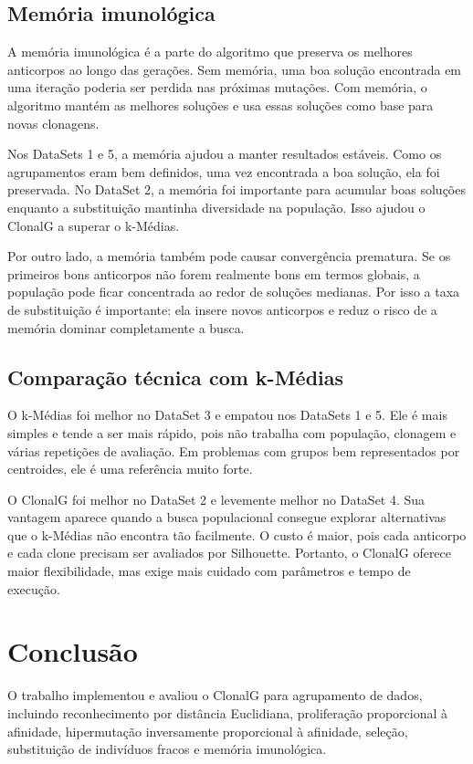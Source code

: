 \documentclass[12pt,a4paper]{article}
\begin{document}
\subsection{Memória imunológica}

A memória imunológica é a parte do algoritmo que preserva os melhores anticorpos ao longo das gerações. Sem memória, uma boa solução encontrada em uma iteração poderia ser perdida nas próximas mutações. Com memória, o algoritmo mantém as melhores soluções e usa essas soluções como base para novas clonagens.

Nos DataSets 1 e 5, a memória ajudou a manter resultados estáveis. Como os agrupamentos eram bem definidos, uma vez encontrada a boa solução, ela foi preservada. No DataSet 2, a memória foi importante para acumular boas soluções enquanto a substituição mantinha diversidade na população. Isso ajudou o ClonalG a superar o k-Médias.

Por outro lado, a memória também pode causar convergência prematura. Se os primeiros bons anticorpos não forem realmente bons em termos globais, a população pode ficar concentrada ao redor de soluções medianas. Por isso a taxa de substituição é importante: ela insere novos anticorpos e reduz o risco de a memória dominar completamente a busca.

\subsection{Comparação técnica com k-Médias}

O k-Médias foi melhor no DataSet 3 e empatou nos DataSets 1 e 5. Ele é mais simples e tende a ser mais rápido, pois não trabalha com população, clonagem e várias repetições de avaliação. Em problemas com grupos bem representados por centroides, ele é uma referência muito forte.

O ClonalG foi melhor no DataSet 2 e levemente melhor no DataSet 4. Sua vantagem aparece quando a busca populacional consegue explorar alternativas que o k-Médias não encontra tão facilmente. O custo é maior, pois cada anticorpo e cada clone precisam ser avaliados por Silhouette. Portanto, o ClonalG oferece maior flexibilidade, mas exige mais cuidado com parâmetros e tempo de execução.

\section{Conclusão}

O trabalho implementou e avaliou o ClonalG para agrupamento de dados, incluindo reconhecimento por distância Euclidiana, proliferação proporcional à afinidade, hipermutação inversamente proporcional à afinidade, seleção, substituição de indivíduos fracos e memória imunológica.
\end{document}
